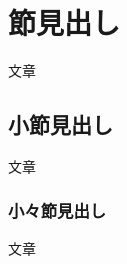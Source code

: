 \documentclass{jsarticle}
\begin{document}
  \section*{節見出し}
  文章
  \subsection*{小節見出し}
  文章
  \subsubsection*{小々節見出し}
  文章
\end{document}
